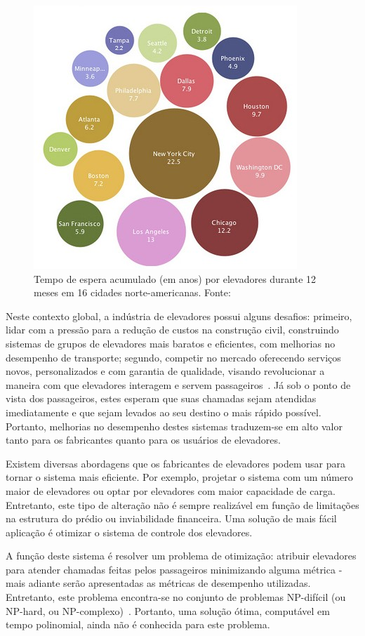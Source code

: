 \begin{figure}[htb!]
\centering\includegraphics{img/time-cost.jpg}
\caption{\label{fig:fig1}Tempo de espera acumulado (em anos) por elevadores
durante 12 meses em 16 cidades norte-americanas. Fonte:~\cite{IBM10}}
\end{figure}

Neste contexto global, a indústria de elevadores possui alguns desafios:
primeiro, lidar com a pressão para a redução de custos na construção civil,
construindo sistemas de grupos de elevadores mais baratos e eficientes, com
melhorias no desempenho de transporte; segundo, competir no mercado oferecendo
serviços novos, personalizados e com garantia de qualidade, visando revolucionar
a maneira com que elevadores interagem e servem
passageiros~\cite{KOEHLEROTTIGER02}. Já sob o ponto de vista dos passageiros,
estes esperam que suas chamadas sejam atendidas imediatamente e que sejam
levados ao seu destino o mais rápido possível. Portanto, melhorias no desempenho
destes sistemas traduzem-se em alto valor tanto para os fabricantes quanto para
os usuários de elevadores.

Existem diversas abordagens que os fabricantes de elevadores podem usar para
tornar o sistema mais eficiente. Por exemplo, projetar o sistema com um número
maior de elevadores ou optar por elevadores com maior capacidade de carga.
Entretanto, este tipo de alteração não é sempre realizável em função de
limitações na estrutura do prédio ou inviabilidade financeira. Uma solução de
mais fácil aplicação é otimizar o sistema de controle dos elevadores.

A função deste sistema é resolver um problema de otimização: atribuir elevadores
para atender chamadas feitas pelos passageiros minimizando alguma métrica - mais
adiante serão apresentadas as métricas de desempenho utilizadas. Entretanto,
este problema encontra-se no conjunto de problemas NP-difícil (ou NP-hard, ou
NP-complexo)~\cite{SeKo99}. Portanto, uma solução ótima, computável em tempo
polinomial, ainda não é conhecida para este problema.

